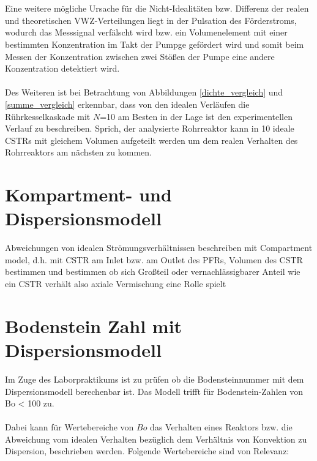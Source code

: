 \documentclass[12pt,liststotoc]{report}
\begin{document}
\\
\\
Eine weitere mögliche Ursache für die Nicht-Idealitäten bzw. Differenz der realen und theoretischen VWZ-Verteilungen liegt in der Pulsation des Förderstroms, wodurch das Messsignal verfälscht wird bzw. ein Volumenelement mit einer bestimmten Konzentration im Takt der Pumpge gefördert wird und somit beim Messen der Konzentration zwischen zwei Stößen der Pumpe eine andere Konzentration detektiert wird. 
\\
\\
Des Weiteren ist bei Betrachtung von Abbildungen \ref{dichte_vergleich} und \ref{summe_vergleich} erkennbar, dass von den idealen Verläufen die Rührkesselkaskade mit $N$=10 am Besten in der Lage ist den experimentellen Verlauf zu beschreiben. Sprich, der analysierte Rohrreaktor kann in 10 ideale CSTRs mit gleichem Volumen aufgeteilt werden um dem realen Verhalten des Rohrreaktors am nächsten zu kommen. 





\section{Kompartment- und Dispersionsmodell}

Abweichungen von idealen Strömungsverhältnissen beschreiben mit Compartment model, d.h. mit CSTR am Inlet bzw. am Outlet des PFRs, Volumen des CSTR bestimmen und bestimmen ob sich Großteil oder vernachlässigbarer Anteil wie ein CSTR verhält also axiale Vermischung eine Rolle spielt


\section{Bodenstein Zahl mit Dispersionsmodell}

Im Zuge des Laborpraktikums ist zu prüfen ob die Bodensteinnummer mit dem Dispersionsmodell berechenbar ist. Das Modell trifft für Bodenstein-Zahlen von Bo < 100 zu.
\\
\\
Dabei kann für Wertebereiche von $Bo$  das Verhalten eines Reaktors bzw. die Abweichung vom idealen Verhalten bezüglich dem Verhältnis von Konvektion zu Dispersion, beschrieben werden. Folgende Wertebereiche sind von Relevanz:
\end{document}
